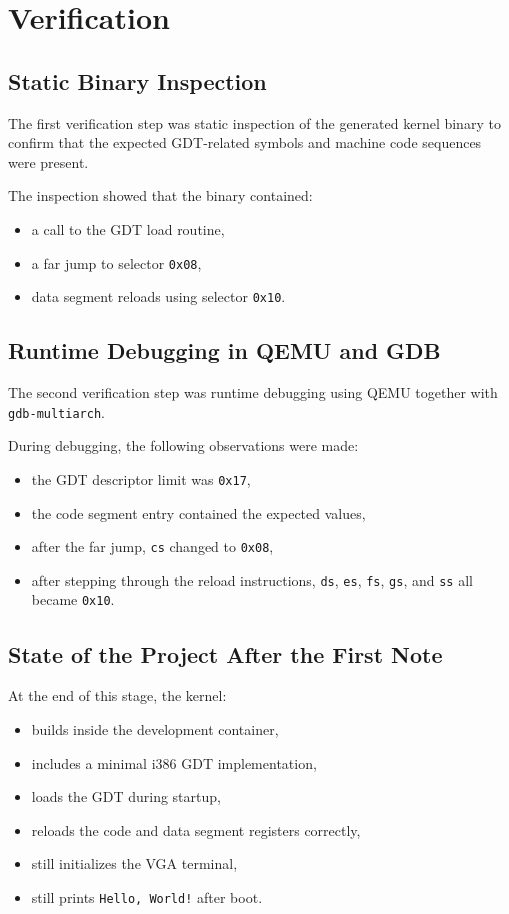 \section{Verification}

\subsection{Static Binary Inspection}
The first verification step was static inspection of the generated kernel binary to confirm that the expected GDT-related symbols and machine code sequences were present.

The inspection showed that the binary contained:
\begin{itemize}
  \item a call to the GDT load routine,
  \item a far jump to selector \texttt{0x08},
  \item data segment reloads using selector \texttt{0x10}.
\end{itemize}

\subsection{Runtime Debugging in QEMU and GDB}
The second verification step was runtime debugging using QEMU together with \texttt{gdb-multiarch}.

During debugging, the following observations were made:
\begin{itemize}
  \item the GDT descriptor limit was \texttt{0x17},
  \item the code segment entry contained the expected values,
  \item after the far jump, \texttt{cs} changed to \texttt{0x08},
  \item after stepping through the reload instructions, \texttt{ds}, \texttt{es}, \texttt{fs}, \texttt{gs}, and \texttt{ss} all became \texttt{0x10}.
\end{itemize}

\subsection{State of the Project After the First Note}
At the end of this stage, the kernel:
\begin{itemize}
  \item builds inside the development container,
  \item includes a minimal i386 GDT implementation,
  \item loads the GDT during startup,
  \item reloads the code and data segment registers correctly,
  \item still initializes the VGA terminal,
  \item still prints \texttt{Hello, World!} after boot.
\end{itemize}
